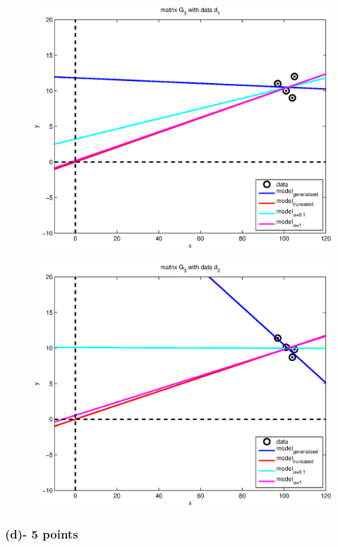 \documentclass[11pt]{article}
\begin{document}
\begin{figure}
\begin{center}
  \includegraphics[width=12cm]{p3b3.eps}
  \end{center}
\end{figure}
\begin{figure}
\begin{center}
  \includegraphics[width=12cm]{p3b4.eps}
  \end{center}
\end{figure}

\subsubsection*{(d)- 5 points}
\end{document}
